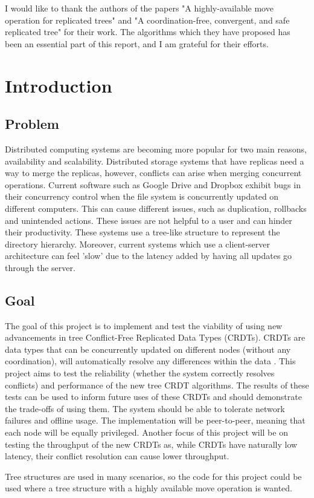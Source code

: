 \documentclass[12pt]{report}
\begin{document}
I would like to thank the authors of the papers "A highly-available move operation for replicated
trees"\cite{9563274} and "A coordination-free, convergent, and safe replicated tree"\cite{https://doi.org/10.48550/arxiv.2103.04828} for their work. The algorithms which they have proposed has been an essential part of this report, and I am grateful for their efforts. \par 


\newpage
\tableofcontents

\newpage

\setcounter{page}{1}

\chapter{Introduction}

\section{Problem}
Distributed computing systems are becoming more popular for two main reasons, availability and scalability. Distributed storage systems that have replicas need a way to merge the replicas, however, conflicts can arise when merging concurrent operations. Current software such as Google Drive and Dropbox exhibit bugs in their concurrency control when the file system is concurrently updated on different computers. This can cause different issues, such as duplication, rollbacks and unintended actions. These issues are not helpful to a user and can hinder their productivity. These systems use a tree-like structure to represent the directory hierarchy. Moreover, current systems which use a client-server architecture can feel 'slow' due to the latency added by having all updates go through the server.

\section{Goal}
The goal of this project is to implement and test the viability of using new advancements in tree Conflict-Free Replicated Data Types (CRDTs). CRDTs are data types that can be concurrently updated on different nodes (without any coordination), will automatically resolve any differences within the data \cite{10.1007/978-3-642-24550-3_29}. This project aims to test the reliability (whether the system correctly resolves conflicts) and performance of the new tree CRDT algorithms. The results of these tests can be used to inform future uses of these CRDTs and should demonstrate the trade-offs of using them. The system should be able to tolerate network failures and offline usage. The implementation will be peer-to-peer, meaning that each node will be equally privileged. Another focus of this project will be on testing the throughput of the new CRDTs as, while CRDTs have naturally low latency, their conflict resolution can cause lower throughput. \par
Tree structures are used in many scenarios, so the code for this project could be used where a tree structure with a highly available move operation is wanted.
\end{document}
